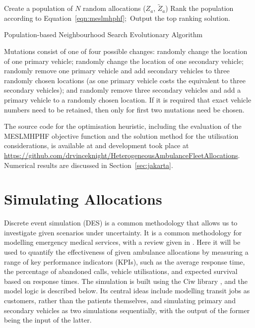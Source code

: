 \documentclass[preprint,12pt]{elsarticle}
\begin{document}
\begin{algorithm}
\SetAlgoLined
Create a population of $N$ random allocations ($Z_a$, $\tilde{Z}_a$)\;
Rank the population according to Equation~\ref{eqn:meslmhphf};\
Output the top ranking solution.
\caption{Population-based Neighbourhood Search Evolutionary Algorithm}
\label{alg:heuristic}
\end{algorithm}

Mutations consist of one of four possible changes: randomly change the location
of one primary vehicle; randomly change the location of one secondary vehicle;
randomly remove one primary vehicle and add secondary vehicles to three randomly
chosen locations (as one primary vehicle costs the equivalent to three secondary
vehicles); and randomly remove three secondary vehicles and add a primary
vehicle to a randomly chosen location. If it is required that exact vehicle
numbers need to be retained, then only for first two mutations need be chosen.

The source code for the optimisation heuristic, including the evaluation of
the MESLMHPHF objective function and the solution method for the utilisation
considerations, is available at \cite{zenodo_opt} and development took place at
\url{https://github.com/drvinceknight/HeterogeneousAmbulanceFleetAllocations}.
Numerical results are discussed in Section~\ref{sec:jakarta}.



\section{Simulating Allocations}\label{sec:simulation}
Discrete event simulation (DES) is a common methodology that allows us to
investigate given scenarios under uncertainty. It is a common methodology for
modelling emergency medical services, with a review given
in \cite{aboueljinane13}. Here it will be used to
quantify the effectiveness of given ambulance allocations by measuring a range
of key performance indicators (KPIs), such as the average response time, the
percentage of abandoned calls, vehicle utilisations, and expected survival
based on response times. The simulation is built using the Ciw library
\cite{palmer2019ciw}, and the model logic is described below. Its central
ideas include modelling transit jobs as customers, rather than the patients
themselves, and simulating primary and secondary vehicles as two simulations
sequentially, with the output of the former being the input of the latter.
\end{document}
